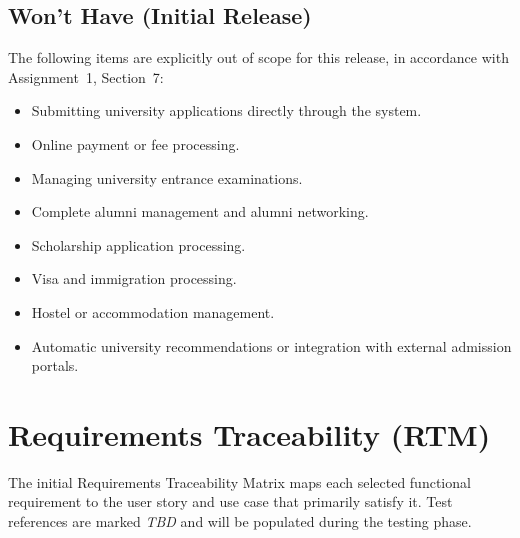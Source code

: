 \documentclass[11pt,a4paper]{article}
\begin{document}
\subsection*{Won't Have (Initial Release)}
The following items are explicitly out of scope for this release, in accordance with Assignment~1, Section~7:
\begin{itemize}
  \item Submitting university applications directly through the system.
  \item Online payment or fee processing.
  \item Managing university entrance examinations.
  \item Complete alumni management and alumni networking.
  \item Scholarship application processing.
  \item Visa and immigration processing.
  \item Hostel or accommodation management.
  \item Automatic university recommendations or integration with external admission portals.
\end{itemize}

\section{Requirements Traceability (RTM)}
The initial Requirements Traceability Matrix maps each selected
functional requirement to the user story and use case that primarily
satisfy it. Test references are marked \emph{TBD} and will be populated
during the testing phase.
\end{document}
